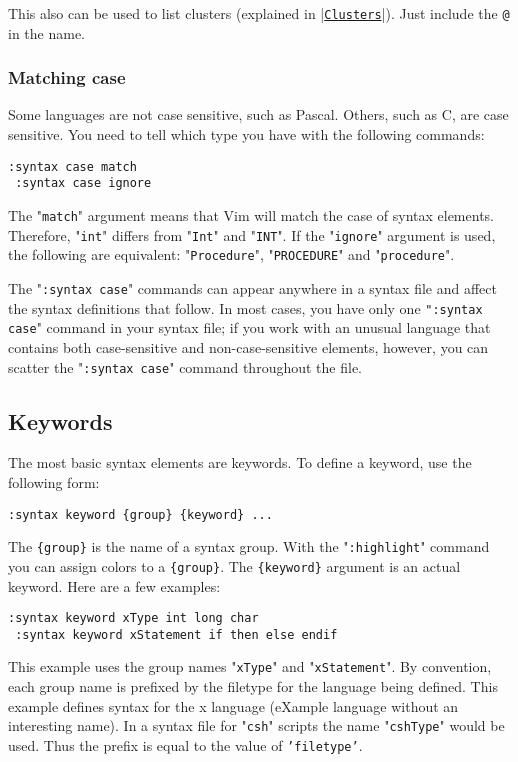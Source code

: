 This also can be used to list clusters (explained in |\hyperref[Clusters]{\texttt{Clusters}}|).
Just include the \texttt{@} in the name.

\subsubsection{Matching case}
Some languages are not case sensitive, such as Pascal.
Others, such as C, are case sensitive.
You need to tell which type you have with the following commands:

\begin{Verbatim}[samepage=true]
 :syntax case match
 :syntax case ignore
\end{Verbatim}

The "\texttt{match}" argument means that Vim will match the case of syntax elements.
Therefore, "\texttt{int}" differs from "\texttt{Int}" and "\texttt{INT}".
If the "\texttt{ignore}" argument is used, the following are equivalent: "\texttt{Procedure}", "\texttt{PROCEDURE}" and "\texttt{procedure}".

The "\texttt{:syntax case}" commands can appear anywhere in a syntax file and affect the syntax definitions that follow.
In most cases, you have only one \texttt{":syntax case}" command in your syntax file; if you work with an unusual language that contains both case-sensitive and non-case-sensitive elements, however, you can scatter the "\texttt{:syntax case}" command throughout the file.
\subsection{Keywords}
The most basic syntax elements are keywords.
To define a keyword, use the following form:

\begin{Verbatim}[samepage=true]
 :syntax keyword {group} {keyword} ...
\end{Verbatim}

The \texttt{\{group\}} is the name of a syntax group.
With the "\texttt{:highlight}" command you can assign colors to a \texttt{\{group\}}.
The \texttt{\{keyword\}} argument is an actual keyword.
Here are a few examples:

\begin{Verbatim}[samepage=true]
 :syntax keyword xType int long char
 :syntax keyword xStatement if then else endif
\end{Verbatim}

This example uses the group names "\texttt{xType}" and "\texttt{xStatement}".
By convention, each group name is prefixed by the filetype for the language being defined.
This example defines syntax for the x language (eXample language without an interesting name).
In a syntax file for "\texttt{csh}" scripts the name "\texttt{cshType}" would be used.
Thus the prefix is equal to the value of \texttt{'filetype'}.

